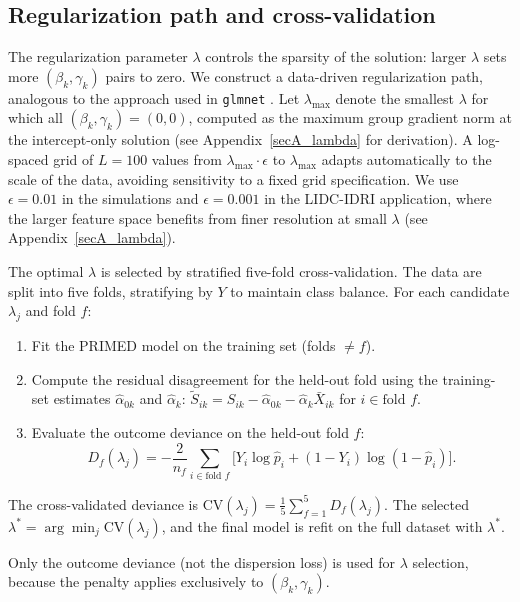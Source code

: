 \documentclass[referee,lineno,pdflatex,sn-vancouver-num]{sn-jnl}
\begin{document}
\subsection{Regularization path and cross-validation}\label{sec:lambda_cv}

The regularization parameter $\lambda$ controls the sparsity of the solution: larger $\lambda$ sets more $(\beta_k, \gamma_k)$ pairs to zero.
We construct a data-driven regularization path, analogous to the approach used in \texttt{glmnet} \cite{Friedman2010}.
Let $\lambda_{\max}$ denote the smallest $\lambda$ for which all $(\beta_k, \gamma_k) = (0, 0)$, computed as the maximum group gradient norm at the intercept-only solution (see Appendix~\ref{secA_lambda} for derivation).
A log-spaced grid of $L = 100$ values from $\lambda_{\max} \cdot \epsilon$ to $\lambda_{\max}$ adapts automatically to the scale of the data, avoiding sensitivity to a fixed grid specification.
We use $\epsilon = 0.01$ in the simulations and $\epsilon = 0.001$ in the LIDC-IDRI application, where the larger feature space benefits from finer resolution at small $\lambda$ (see Appendix~\ref{secA_lambda}).

The optimal $\lambda$ is selected by stratified five-fold cross-validation.
The data are split into five folds, stratifying by $Y$ to maintain class balance.
For each candidate $\lambda_j$ and fold $f$:
\begin{enumerate}
  \item Fit the PRIMED model on the training set (folds $\neq f$).
  \item Compute the residual disagreement for the held-out fold using the training-set estimates $\hat\alpha_{0k}$ and $\hat\alpha_k$: $\tilde S_{ik} = S_{ik} - \hat\alpha_{0k} - \hat\alpha_k \bar X_{ik}$ for $i \in \text{fold } f$.
  \item Evaluate the outcome deviance on the held-out fold $f$:
    \[
      D_f(\lambda_j) = -\frac{2}{n_f}\sum_{i \in \text{fold } f}
        \bigl[Y_i \log \hat p_i + (1-Y_i)\log(1-\hat p_i)\bigr].
    \]
\end{enumerate}
The cross-validated deviance is $\mathrm{CV}(\lambda_j) = \frac{1}{5}\sum_{f=1}^5 D_f(\lambda_j)$.
The selected $\lambda^* = \arg\min_j \mathrm{CV}(\lambda_j)$, and the final model is refit on the full dataset with $\lambda^*$.

Only the outcome deviance (not the dispersion loss) is used for $\lambda$ selection, because the penalty applies exclusively to $(\beta_k, \gamma_k)$.
\end{document}
